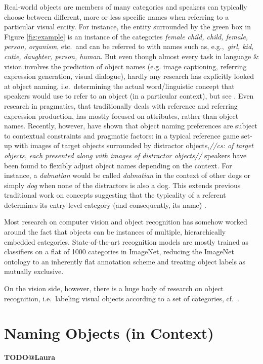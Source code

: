 \documentclass[runningheads]{llncs}
\newcommand{\cs}[1]{\textcolor{PineGreen}{\emph{//cs: #1//}}}
\begin{document}
Real-world objects are members of many categories and speakers can typically choose between different, more or less specific names when referring to a particular visual entity. 
For instance, the entity surrounded by the green box in Figure \ref{fig:example} is an instance of the categories \textit{female child, child, female, person, organism}, etc.\  and can be referred to with names such as, e.g.,\ \textit{girl, kid, cutie, daughter, person, human}.
But even though almost every task in language \& vision involves the prediction of object names (e.g. image captioning, referring expression generation, visual dialogue), hardly any research has explicitly looked at object naming, i.e.\ determining the actual word/linguistic concept that speakers would use to refer to an object (in a particular context), but see \cite{Ordonez:2016,zarriess-schlangen:2017}.
Even research in pragmatics, that traditionally deals with reference and referring expression production, has mostly focused on attributes, rather than object names.
Recently, however, \cite{graf2016animal} have shown that object naming preferences are subject to contextual constraints and pragmatic factors: in a typical reference game set-up with images of target objects surrounded by distractor objects,\cs{of target objects, each  presented along with images of distractor objects} speakers have been found to flexibly adjust object names depending on the context. For instance, a \textit{dalmatian} would be called \textit{dalmatian} in the context of other dogs or simply \textit{dog} when none of the distractors is also a dog.
This extends previous traditional work on concepts suggesting that the typicality of a referent determines its entry-level category (and consequently, its name) \cite{Rosch1978}.


Most research on computer vision and object recognition has somehow worked around the fact that objects can be instances of multiple, hierarchically embedded categories. 
State-of-the-art recognition models are mostly trained as classifiers on a flat of 1000 categories in ImageNet, reducing the ImageNet ontology to an inherently flat annotation scheme and treating
object labels as mutually exclusive.

On the vision side, however, there is a huge body of research on object recognition, i.e.\ labeling visual objects according to a set of categories, cf.\ \cite{simonyan2014very,deng2014large,googlenet}.

\section{Naming Objects (in Context)}
\label{sec:object_naming}
\textbf{TODO@Laura}\\

\end{document}
